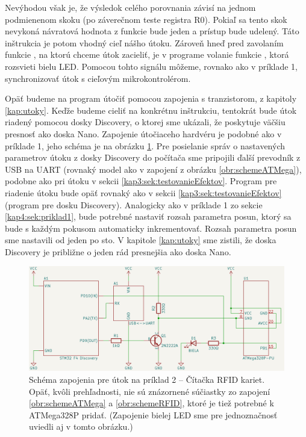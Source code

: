 Nevýhodou však je, že výsledok celého porovnania závisí na jednom podmienenom skoku (po záverečnom teste registra R0). Pokiaľ sa tento skok nevykoná návratová hodnota z funkcie bude jeden a prístup bude udelený. Táto inštrukcia je potom vhodný cieľ nášho útoku. Zároveň hneď pred zavolaním funkcie , na ktorú chceme útok zacieliť, je v programe volanie funkcie , ktorá rozsvieti bielu LED. Pomocou tohto signálu môžeme, rovnako ako v príklade 1, synchronizovať útok s cieľovým mikrokontrolérom.

Opäť budeme na program útočiť pomocou zapojenia s tranzistorom, z kapitoly \ref{kap:utoky}. Keďže budeme cieliť na konkrétnu inštrukciu, tentokrát bude útok riadený pomocou dosky Discovery, o ktorej sme ukázali, že poskytuje väčšiu presnosť ako doska Nano. Zapojenie útočiaceho hardvéru je podobné ako v príklade 1, jeho schéma je na obrázku \ref{obr:schemeCTF-RFID}. Pre posielanie správ o nastavených parametrov útoku z dosky Discovery do počítača sme pripojili ďalší prevodník z USB na UART (rovnaký model ako v zapojení z obrázku \ref{obr:schemeATMega}), podobne ako pri útoku v sekcii \ref{kap3:sek:testovanieEfektov}. Program pre riadenie útoku bude opäť rovnaký ako v sekcii \ref{kap3:sek:testovanieEfektov} (program pre dosku Discovery). Analogicky ako v príklade 1 zo sekcie \ref{kap4:sek:priklad1}, bude potrebné nastaviť rozsah parametra posun, ktorý sa bude s každým pokusom automaticky inkrementovať. Rozsah parametra posun sme nastavili od jeden po sto. V kapitole \ref{kap:utoky} sme zistili, že doska Discovery je približne o jeden rád presnejšia ako doska Nano.

\begin{figure}
    \centerline{\includegraphics[width=1\textwidth]{images/schemeCTF-RFID.png}}
    \caption[Schéma zapojenia pre útok na príklad 2]{Schéma zapojenia pre útok na príklad 2 -- Čítačka RFID kariet. Opäť, kvôli prehľadnosti, nie sú znázornené súčiastky zo zapojení \ref{obr:schemeATMega} a \ref{obr:schemeRFID}, ktoré je tiež potrebné k ATMega328P pridať. (Zapojenie bielej LED sme pre jednoznačnosť uviedli aj v tomto obrázku.)}
    \label{obr:schemeCTF-RFID}
\end{figure}


